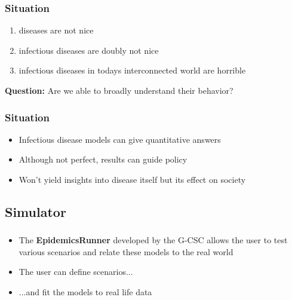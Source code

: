 \documentclass{beamer}
\begin{document}
\begin{frame}
	\frametitle{Situation}
	\begin{enumerate}
		\item diseases are not nice\\\vspace{0.1cm}
	         			
		\item  infectious diseases are doubly not nice \\\vspace{0.1cm}
	       	
                \item infectious diseases in todays interconnected world are horrible	\\\vspace{0.1cm}
	\end{enumerate}

\textbf{Question:} Are we able to broadly understand their behavior?

\end{frame}

\begin{frame}
	\frametitle{Situation}
	\begin{itemize}
		\item Infectious disease models can give quantitative answers\\\vspace{0.1cm}
	         			
		\item  Although not perfect, results can guide policy \\\vspace{0.1cm}
	       	
                \item Won't yield insights into disease itself but its effect on society	\\\vspace{0.1cm}
	\end{itemize}

\end{frame}

\subsection{Simulator}
\begin{frame}
	\frametitle{}
	\begin{itemize}
		\item The \textbf{EpidemicsRunner} developed by the G-CSC allows the user to test various scenarios and relate these models to the real world
	         			
		\item  The user can define scenarios... \\\vspace{0.1cm}
	       	
                \item ...and fit the models to real life data	\\\vspace{0.1cm}

	\end{itemize}

\end{frame}
\end{document}
